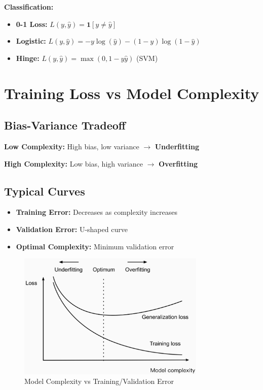 \documentclass{article}
\begin{document}
\textbf{Classification:}
\begin{itemize}
    \item \textbf{0-1 Loss:} $L(y, \hat{y}) = \mathbf{1}[y \neq \hat{y}]$
    \item \textbf{Logistic:} $L(y, \hat{y}) = -y\log(\hat{y}) - (1-y)\log(1-\hat{y})$
    \item \textbf{Hinge:} $L(y, \hat{y}) = \max(0, 1 - y\hat{y})$ (SVM)
\end{itemize}

\section{Training Loss vs Model Complexity}

\subsection{Bias-Variance Tradeoff}
\textbf{Low Complexity:} High bias, low variance $\rightarrow$ \textbf{Underfitting}

\textbf{High Complexity:} Low bias, high variance $\rightarrow$ \textbf{Overfitting}

\subsection{Typical Curves}
\begin{itemize}
    \item \textbf{Training Error:} Decreases as complexity increases
    \item \textbf{Validation Error:} U-shaped curve
    \item \textbf{Optimal Complexity:} Minimum validation error
\end{itemize}

\begin{figure}[h]
\centering
\includegraphics[width=0.8\textwidth]{model-complexity-diagram.png}
\caption{Model Complexity vs Training/Validation Error}
\end{figure}
\end{document}
